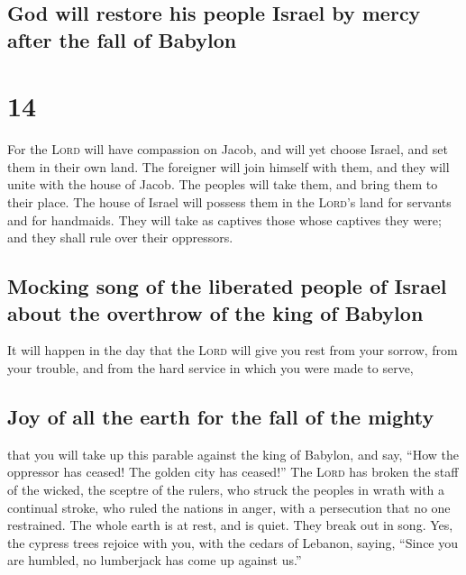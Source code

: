 \hypertarget{god-will-restore-his-people-israel-by-mercy-after-the-fall-of-babylon}{%
\subsection{God will restore his people Israel by mercy after the fall
of
Babylon}\label{god-will-restore-his-people-israel-by-mercy-after-the-fall-of-babylon}}

\hypertarget{section-13}{%
\section{14}\label{section-13}}

 For the \textsc{Lord} will have compassion on Jacob, and
will yet choose Israel, and set them in their own land. The foreigner
will join himself with them, and they will unite with the house of
Jacob.  The peoples will take them, and bring them to
their place. The house of Israel will possess them in the
\textsc{Lord}'s land for servants and for handmaids. They will take as
captives those whose captives they were; and they shall rule over their
oppressors.

\hypertarget{mocking-song-of-the-liberated-people-of-israel-about-the-overthrow-of-the-king-of-babylon}{%
\subsection{Mocking song of the liberated people of Israel about the
overthrow of the king of
Babylon}\label{mocking-song-of-the-liberated-people-of-israel-about-the-overthrow-of-the-king-of-babylon}}

 It will happen in the day that the \textsc{Lord} will
give you rest from your sorrow, from your trouble, and from the hard
service in which you were made to serve,

\hypertarget{joy-of-all-the-earth-for-the-fall-of-the-mighty}{%
\subsection{Joy of all the earth for the fall of the
mighty}\label{joy-of-all-the-earth-for-the-fall-of-the-mighty}}

 that you will take up this parable against the king of
Babylon, and say, ``How the oppressor has ceased! The golden city has
ceased!''  The \textsc{Lord} has broken the staff of the
wicked, the sceptre of the rulers,  who struck the peoples
in wrath with a continual stroke, who ruled the nations in anger, with a
persecution that no one restrained.  The whole earth is at
rest, and is quiet. They break out in song.  Yes, the
cypress trees rejoice with you, with the cedars of Lebanon, saying,
``Since you are humbled, no lumberjack has come up against us.''

